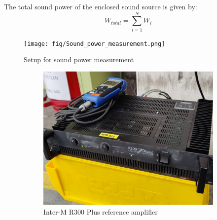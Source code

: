 The total sound power of the enclosed sound source is given by:
\begin{equation}
    W_{total} = \sum_{i = 1}^{N} W_i
\end{equation}

\begin{figure}[H]
\begin{center}
\texttt{[image: fig/Sound\_power\_measurement.png]}
\caption{Setup for sound power measurement}
\label{fig:soundpowersetup}
\end{center}
\end{figure}

\begin{figure}[H]
     \centering
     \begin{subfigure}[b]{0.5\textwidth}
         \centering
         \includegraphics[width=\textwidth]{fig/amplifier_and_signal_generator.jpg}
         \caption{Inter-M R300 Plus reference amplifier}
     \end{subfigure}
     \hspace{0.1\textwidth}
     \begin{subfigure}[b]{0.3\textwidth}
         \centering

\end{subfigure}
\end{figure}
